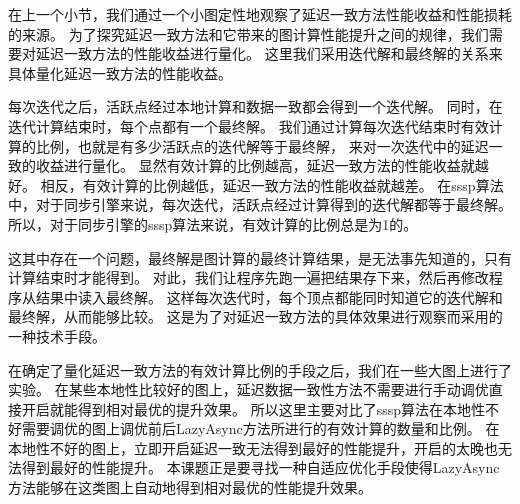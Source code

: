 在上一个小节，我们通过一个小图定性地观察了延迟一致方法性能收益和性能损耗的来源。
为了探究延迟一致方法和它带来的图计算性能提升之间的规律，我们需要对延迟一致方法的性能收益进行量化。
这里我们采用迭代解和最终解的关系来具体量化延迟一致方法的性能收益。

每次迭代之后，活跃点经过本地计算和数据一致都会得到一个迭代解。
同时，在迭代计算结束时，每个点都有一个最终解。
我们通过计算每次迭代结束时有效计算的比例，也就是有多少活跃点的迭代解等于最终解，
来对一次迭代中的延迟一致的收益进行量化。
显然有效计算的比例越高，延迟一致方法的性能收益就越好。
相反，有效计算的比例越低，延迟一致方法的性能收益就越差。
在sssp算法中，对于同步引擎来说，每次迭代，活跃点经过计算得到的迭代解都等于最终解。
所以，对于同步引擎的sssp算法来说，有效计算的比例总是为1的。


这其中存在一个问题，最终解是图计算的最终计算结果，是无法事先知道的，只有计算结束时才能得到。
对此，我们让程序先跑一遍把结果存下来，然后再修改程序从结果中读入最终解。
这样每次迭代时，每个顶点都能同时知道它的迭代解和最终解，从而能够比较。
这是为了对延迟一致方法的具体效果进行观察而采用的一种技术手段。



在确定了量化延迟一致方法的有效计算比例的手段之后，我们在一些大图上进行了实验。
在某些本地性比较好的图上，延迟数据一致性方法不需要进行手动调优直接开启就能得到相对最优的提升效果。
所以这里主要对比了sssp算法在本地性不好需要调优的图上调优前后LazyAsync方法所进行的有效计算的数量和比例。
在本地性不好的图上，立即开启延迟一致无法得到最好的性能提升，开启的太晚也无法得到最好的性能提升。
本课题正是要寻找一种自适应优化手段使得LazyAsync方法能够在这类图上自动地得到相对最优的性能提升效果。

